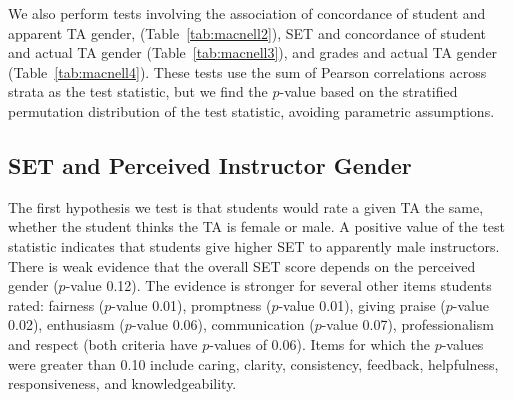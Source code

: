 \documentclass[12pt]{article}
\newcommand{\todo}[1]{{\color{red}{TO DO: \sc #1}}}
\begin{document}
We also perform tests involving the association of concordance of student and apparent 
TA gender,
(Table~\ref{tab:macnell2}), SET and concordance of student and actual TA gender 
(Table~\ref{tab:macnell3}), and grades and actual TA gender (Table~\ref{tab:macnell4}).  
These tests use the sum of Pearson correlations across strata as the test statistic, 
but we find the $p$-value
based on the stratified permutation distribution of the test statistic, avoiding
parametric assumptions.

\subsection{SET and Perceived Instructor Gender}
\todo{make sure the category names make sense in the prose}
The first hypothesis we test is that students would rate a given TA the same,
whether the student thinks the TA is female or male. 
A positive value of the test statistic indicates that students give higher SET
to apparently male instructors.
There is weak evidence that the overall SET score depends on the perceived gender ($p$-value 0.12). 
The evidence is stronger for several other items students rated: fairness ($p$-value 0.01), 
promptness ($p$-value 0.01), giving praise ($p$-value 0.02), 
enthusiasm ($p$-value 0.06), communication ($p$-value 0.07), professionalism and respect 
(both criteria have $p$-values of 0.06). 
Items for which the $p$-values were greater than 0.10 include caring, clarity,
consistency, feedback, helpfulness, responsiveness, and knowledgeability.
\end{document}
